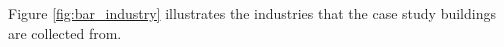 Figure \ref{fig:bar_industry} illustrates the industries that the case study buildings are collected from.